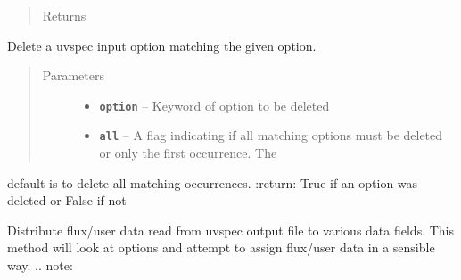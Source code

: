\documentclass[a4paper,10pt,english]{sphinxmanual}
\begin{document}
\begin{fulllineitems}
\begin{fulllineitems}
\begin{quote}
\begin{description}
\begin{itemize}
\end{itemize}

\item[{Returns}] \leavevmode


\end{description}\end{quote}

\end{fulllineitems}


\begin{fulllineitems}
\label{packages:librad.Case.del_option}
Delete a uvspec input option matching the given option.
\begin{quote}\begin{description}
\item[{Parameters}] \leavevmode\begin{itemize}
\item {} 
\textbf{\texttt{option}} -- Keyword of option to be deleted

\item {} 
\textbf{\texttt{all}} -- A flag indicating if all matching options must be deleted or only the first occurrence. The

\end{itemize}

\end{description}\end{quote}

default is to delete all matching occurrences.
:return: True if an option was deleted or False if not

\end{fulllineitems}


\begin{fulllineitems}
\label{packages:librad.Case.distribute_flux_data}
Distribute flux/user data read from uvspec output file to various data fields.
This method will look at  options and attempt to assign flux/user data in a sensible way.
.. note:


\end{fulllineitems}
\end{fulllineitems}
\end{document}
